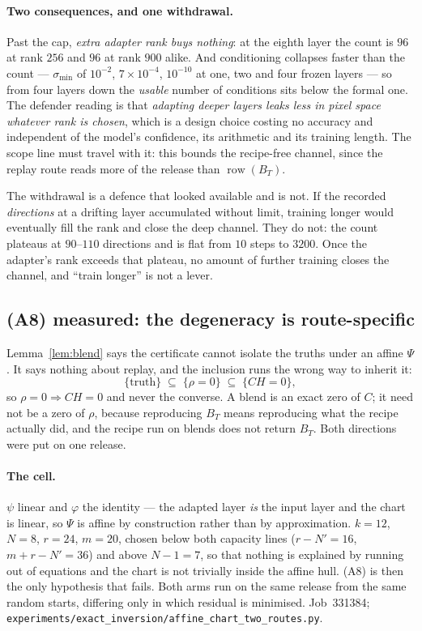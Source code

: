 \paragraph{Two consequences, and one withdrawal.} Past the cap, \emph{extra
adapter rank buys nothing}: at the eighth layer the count is $96$ at rank
$256$ and $96$ at rank $900$ alike. And conditioning collapses faster than the
count --- $\sigma_{\min}$ of $10^{-2}$, $7\times10^{-4}$, $10^{-10}$ at one,
two and four frozen layers --- so from four layers down the \emph{usable}
number of conditions sits below the formal one. The defender reading is that
\emph{adapting deeper layers leaks less in pixel space whatever rank is
chosen}, which is a design choice costing no accuracy and independent of the
model's confidence, its arithmetic and its training length. The scope line
must travel with it: this bounds the recipe-free channel, since the replay
route reads more of the release than $\operatorname{row}(B_T)$.

The withdrawal is a defence that looked available and is not. If the recorded
\emph{directions} at a drifting layer accumulated without limit, training
longer would eventually fill the rank and close the deep channel. They do not:
the count plateaus at $90$--$110$ directions and is flat from $10$ steps to
$3200$. Once the adapter's rank exceeds that plateau, no amount of further
training closes the channel, and ``train longer'' is not a lever.

\subsection{(A8) measured: the degeneracy is route-specific}
\label{sec:a7-measured}

Lemma~\ref{lem:blend} says the certificate cannot isolate the truths under an
affine $\Psi$. It says nothing about replay, and the inclusion runs the wrong
way to inherit it:
\[
  \{\text{truth}\}\;\subseteq\;\{\rho=0\}\;\subseteq\;\{CH=0\},
\]
so $\rho=0\Rightarrow CH=0$ and never the converse. A blend is an exact zero of
$C$; it need not be a zero of $\rho$, because reproducing $B_T$ means
reproducing what the recipe actually did, and the recipe run on blends does not
return $B_T$. Both directions were put on one release.

\paragraph{The cell.} $\psi$ linear and $\varphi$ the identity --- the adapted
layer \emph{is} the input layer and the chart is linear, so $\Psi$ is affine by
construction rather than by approximation. $k=12$, $N=8$, $r=24$, $m=20$, chosen
below both capacity lines ($r-N'=16$, $m+r-N'=36$) and above $N-1=7$, so that
nothing is explained by running out of equations and the chart is not trivially
inside the affine hull. (A8) is then the only hypothesis that fails. Both arms
run on the same release from the same random starts, differing only in which
residual is minimised. Job~331384;
\texttt{experiments/exact\_inversion/affine\_chart\_two\_routes.py}.

